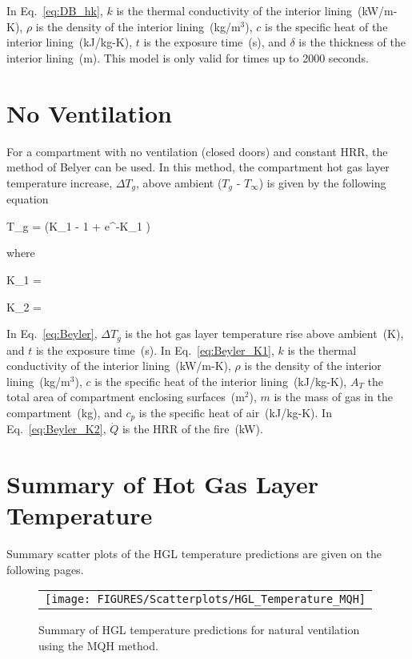 In Eq.~\ref{eq:DB_hk}, $k$ is the thermal conductivity of the interior lining~(kW/m-K), $\rho$ is the density of the interior lining~(kg/m$^3$), $c$ is the specific heat of the interior lining~(kJ/kg-K), $t$ is the exposure time~(s), and $\delta$ is the thickness of the interior lining~(m). This model is only valid for times up to 2000 seconds.



\clearpage


\section{No Ventilation}

For a compartment with no ventilation (closed doors) and constant HRR, the method of Belyer can be used. In this method, the compartment hot gas layer temperature increase, $\Delta T_g$, above ambient ($T_g$ - $T_\infty$) is given by the following equation

\be
\Delta T_g =  (K_1  - 1 + e^{-K_1 })
\label{eq:Beyler}
\ee

\noindent where

\be
K_1 = 
\label{eq:Beyler_K1}
\ee

\be
K_2 = 
\label{eq:Beyler_K2}
\ee

In Eq.~\ref{eq:Beyler}, $\Delta T_g$ is the hot gas layer temperature rise above ambient~(K), and $t$ is the exposure time~(s). In Eq.~\ref{eq:Beyler_K1}, $k$ is the thermal conductivity of the interior lining~(kW/m-K), $\rho$ is the density of the interior lining~(kg/m$^3$), $c$ is the specific heat of the interior lining~(kJ/kg-K), $A_T$ the total area of compartment enclosing surfaces~(m$^2$), $m$ is the mass of gas in the compartment~(kg), and $c_p$ is the specific heat of air~(kJ/kg-K). In Eq.~\ref{eq:Beyler_K2}, $\dot Q$ is the HRR of the fire~(kW).


\clearpage


\section{Summary of Hot Gas Layer Temperature}

Summary scatter plots of the HGL temperature predictions are given on the following pages.

\begin{figure}[ht]
\begin{center}
\begin{tabular}{l}
\texttt{[image: FIGURES/Scatterplots/HGL\_Temperature\_MQH]}
\end{tabular}
\end{center}
\caption[Summary of HGL temperature predictions for natural ventilation.]
{Summary of HGL temperature predictions for natural ventilation using the MQH method.}
\label{HGL_Summary_Natural_Ventilation}
\end{figure}

